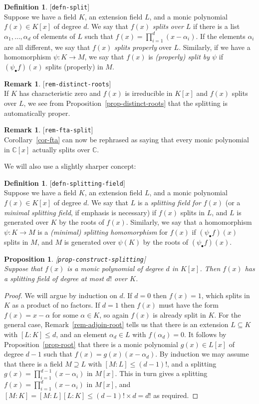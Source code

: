 \documentclass{amsart}
\newcommand{\lbl}[1]{\label{#1}\textup{[\texttt{#1}]}\ \\}
\newcommand{\lbl}{\label}
\newcommand{\C}         {{\mathbb{C}}}
\newcommand{\al}        {\alpha}
\newcommand{\tm}        {\times}
\renewcommand{\:}{\colon}
\newtheorem{proposition}[theorem]{Proposition}
\theoremstyle{definition}
\newtheorem{remark}[theorem]{Remark}
\newtheorem{definition}[theorem]{Definition}
\begin{document}
\begin{definition}\lbl{defn-split}
 Suppose we have a field $K$, an extension field $L$, and a monic
 polynomial $f(x)\in K[x]$ of degree $d$.  We say that $f(x)$
 \emph{splits over $L$} if there is a list $\al_1,\dotsc,\al_d$
 of elements of $L$ such that $f(x)=\prod_{i=1}^d(x-\al_i)$.  If the
 elements $\al_i$ are all different, we say that $f(x)$ \emph{splits
  properly} over $L$.  Similarly, if we have a homomorphism
 $\psi\:K\to M$, we say that $f(x)$ is \emph{(properly) split by
  $\psi$} if $(\psi_\bullet f)(x)$ splits (properly) in $M$.
\end{definition}

\begin{remark}\lbl{rem-distinct-roots}
 If $K$ has characteristic zero and $f(x)$ is irreducible in $K[x]$
 and $f(x)$ splits over $L$, we see from
 Proposition~\ref{prop-distinct-roots} that the splitting is
 automatically proper.
\end{remark}

\begin{remark}\lbl{rem-fta-split}
 Corollary~\ref{cor-fta} can now be rephrased as saying that every
 monic polynomial in $\C[x]$ actually splits over $\C$.
\end{remark}

We will also use a slightly sharper concept:
\begin{definition}\lbl{defn-splitting-field}
 Suppose we have a field $K$, an extension field $L$, and a monic
 polynomial $f(x)\in K[x]$ of degree $d$.  We say that $L$ is a
 \emph{splitting field for $f(x)$} (or a \emph{minimal splitting
  field}, if emphasis is necessary) if $f(x)$ splits in $L$, and $L$
 is generated over $K$ by the roots of $f(x)$.  Similarly, we say that 
 a homomorphism $\psi\:K\to M$ is a \emph{(minimal) splitting
  homomorphism} for $f(x)$ if $(\psi_\bullet f)(x)$ splits in $M$, and
 $M$ is generated over $\psi(K)$ by the roots of
 $(\psi_\bullet f)(x)$.
\end{definition}

\begin{proposition}\lbl{prop-construct-splitting}
 Suppose that $f(x)$ is a monic polynomial of degree $d$ in $K[x]$.
 Then $f(x)$ has a splitting field of degree at most $d!$ over $K$.
\end{proposition}
\begin{proof}
 We will argue by induction on $d$.  If $d=0$ then $f(x)=1$, which
 splits in $K$ as a product of no factors.  If $d=1$ then $f(x)$ must
 have the form $f(x)=x-\al$ for some $\al\in K$, so again $f(x)$ is
 already split in $K$.  For the general case,
 Remark~\ref{rem-adjoin-root} tells us that there is an
 extension $L\subseteq K$ with $[L:K]\leq d$, and an element
 $\al_d\in L$ with $f(\al_d)=0$.  It
 follows by Proposition~\ref{prop-root} that there is a monic
 polynomial $g(x)\in L[x]$ of degree $d-1$ such that
 $f(x)=g(x)(x-\al_d)$.  By induction we may assume that
 there is a field $M\supseteq L$ with $[M:L]\leq(d-1)!$, and a
 splitting $g(x)=\prod_{i=1}^{d-1}(x-\al_i)$ in $M[x]$.  This in turn
 gives a splitting $f(x)=\prod_{i=1}^d(x-\al_i)$ in $M[x]$, and
 $[M:K]=[M:L][L:K]\leq (d-1)!\tm d=d!$ as required.
\end{proof}
\end{document}
